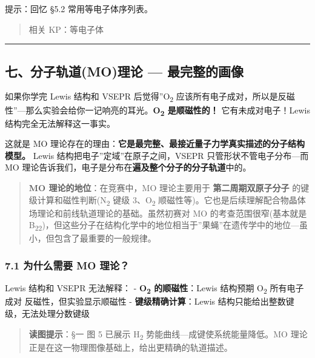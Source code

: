 提示：回忆 §5.2 常用等电子体序列表。

\begin{quote}
相关 KP：等电子体
\end{quote}

\begin{center}\rule{0.5\linewidth}{0.5pt}\end{center}

\subsection{七、分子轨道(MO)理论 --- 最完整的画像}\label{ux4e03ux5206ux5b50ux8f68ux9053moux7406ux8bba-ux6700ux5b8cux6574ux7684ux753bux50cf}

如果你学完 Lewis 结构和 VSEPR 后觉得''O\textsubscript{2} 应该所有电子成对，所以是反磁性''---那么实验会给你一记响亮的耳光。\textbf{O\textsubscript{2} 是顺磁性的！} 它有未成对电子！Lewis 结构完全无法解释这一事实。

这就是 MO 理论存在的理由：\textbf{它是最完整、最接近量子力学真实描述的分子结构模型。} Lewis 结构把电子''定域''在原子之间，VSEPR 只管形状不管电子分布---而 MO 理论告诉我们，电子是分布在\textbf{遍及整个分子的分子轨道}中的。

\begin{quote}
\textbf{MO 理论的地位}：在竞赛中，MO 理论主要用于 \textbf{第二周期双原子分子} 的键级计算和磁性判断(N\textsubscript{2} 键级 3、O\textsubscript{2} 顺磁性等)。它也是后续理解配合物晶体场理论和前线轨道理论的基础。虽然初赛对 MO 的考查范围很窄(基本就是 B\textsubscript{2}\textsubscript{2})，但这些分子在结构化学中的地位相当于''果蝇''在遗传学中的地位---虽小，但包含了最重要的一般规律。
\end{quote}

\subsubsection{7.1 为什么需要 MO 理论？}\label{ux4e3aux4ec0ux4e48ux9700ux8981-mo-ux7406ux8bba}

Lewis 结构和 VSEPR 无法解释：
- \textbf{O\textsubscript{2} 的顺磁性}：Lewis 结构预期 O\textsubscript{2} 所有电子成对 \箭 反磁性，但实验显示顺磁性
- \textbf{键级精确计算}：Lewis 结构只能给出整数键级，无法处理分数键级

\begin{quote}
\textbf{读图提示}：§一 图 5 已展示 H\textsubscript{2} 势能曲线---成键使系统能量降低。MO 理论正是在这一物理图像基础上，给出更精确的轨道描述。
\end{quote}

